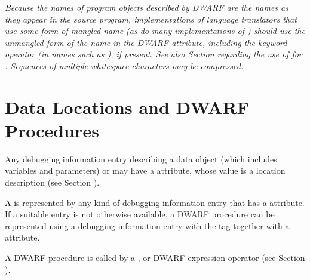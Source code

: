 \textit{Because the names of program objects described by DWARF are the
names as they appear in the source program, implementations
of language translators that use some form of mangled name
(as do many implementations of ) should use the unmangled
form of the name in the 
DWARF \DWATname{} attribute,
including the keyword operator (in names such as ),
if present. See also 
Section  regarding the use
of \DWATlinkagename{} for 
.
Sequences of
multiple whitespace characters may be compressed.}

\section{Data Locations and DWARF Procedures}
Any debugging information entry describing a data object (which
\hypertarget{chap:DWATlocationdataobjectlocation}{}
includes variables and parameters) or 
may have 
a
\DWATlocation{} attribute,
whose value is a location description
(see Section ).

A 
is represented by any
kind of debugging information entry that has 
a 
\DWATlocation{}
attribute. 
If a suitable entry is not otherwise available,
a DWARF procedure can be represented using a debugging
information entry with the 
tag \DWTAGdwarfprocedureTARG{}
together with 
a \DWATlocation{} attribute.  

A DWARF procedure
is called by a \DWOPcalltwo, 
\DWOPcallfour{} or 
\DWOPcallref{}
DWARF expression operator 
(see Section ).

